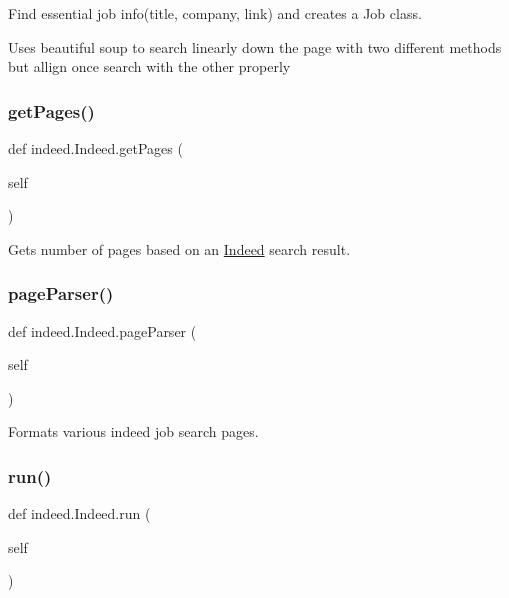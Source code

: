 Find essential job info(title, company, link) and creates a Job class. 

Uses beautiful soup to search linearly down the page with two different methods but allign once search with the other properly \mbox{\label{classindeed_1_1Indeed_a8eb93c40c02d65313a51de249ef377d0}} 
\subsubsection{\texorpdfstring{get\+Pages()}{getPages()}}
{\footnotesize\ttfamily def indeed.\+Indeed.\+get\+Pages (\begin{DoxyParamCaption}\item[{}]{self }\end{DoxyParamCaption})}



Gets number of pages based on an \hyperlink{classindeed_1_1Indeed}{Indeed} search result. 

\mbox{\label{classindeed_1_1Indeed_ae460f5026455d12e9b50ceabc1a373dc}} 
\subsubsection{\texorpdfstring{page\+Parser()}{pageParser()}}
{\footnotesize\ttfamily def indeed.\+Indeed.\+page\+Parser (\begin{DoxyParamCaption}\item[{}]{self }\end{DoxyParamCaption})}



Formats various indeed job search pages. 

\mbox{\label{classindeed_1_1Indeed_ab5b7de5f85902f3d22be6bc176bc5146}} 
\subsubsection{\texorpdfstring{run()}{run()}}
{\footnotesize\ttfamily def indeed.\+Indeed.\+run (\begin{DoxyParamCaption}\item[{}]{self }\end{DoxyParamCaption})}



